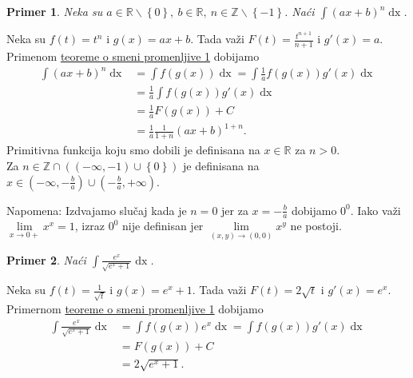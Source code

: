 \documentclass{article}
\newtheorem{prim}{Primer}[section]
\DeclareMathOperator{\dx}{dx}
\begin{document}
\begin{primbox}
    \label{primer_1.7}
    \begin{prim}
        Neka su $a \in \mathbb{R}\backslash\left\{0\right\},\ b\in\mathbb{R},\ n \in \mathbb{Z}\backslash\left\{-1\right\}$. Naći $\displaystyle\int\left(ax + b\right)^n\dx$.
    \end{prim}
    Neka su $f\left(t\right) = t^n$ i $g\left(x\right) = ax+b$. Tada važi $\displaystyle F\left(t\right) = \frac{t^{n+1}}{n+1}$ i $g'\left(x\right) = a$. Primenom \hyperref[teorema_1.2]{teoreme o smeni promenljive 1} dobijamo
    \begin{align*}
        \int\left(ax + b\right)^n\dx & = \int f\left(g\left(x\right)\right)\dx = \int\frac{1}{a}f\left(g\left(x\right)\right)g'\left(x\right)\dx \\
                                     & = \frac{1}{a}\int f\left(g\left(x\right)\right)g'\left(x\right)\dx                                        \\
                                     & = \frac{1}{a}F\left(g\left(x\right)\right) + C                                                            \\
                                     & = \frac{1}{a}\frac{1}{1+n}\left(ax + b\right)^{1+n}.
    \end{align*}
    Primitivna funkcija koju smo dobili je definisana na $x \in \mathbb{R}$ za $n > 0$.\\
    Za $n\in \mathbb{Z} \cap \left(\left(-\infty, -1\right)\cup\left\{0\right\}\right)$ je definisana na $\displaystyle x \in \left(-\infty, -\frac{b}{a}\right)\cup\left(-\frac{b}{a}, +\infty\right)$.\par
    Napomena: Izdvajamo slučaj kada je $n=0$ jer za $\displaystyle x=-\frac{b}{a}$ dobijamo $0^0$. Iako važi $\lim\limits_{x\longrightarrow0+}x^x = 1$, izraz
    $0^0$ nije definisan jer $\lim\limits_{\left(x, y\right)\longrightarrow\left(0,0\right)} x^y$ ne postoji.
\end{primbox}

\begin{primbox}
    \label{primer_1.8}
    \begin{prim}
        Naći $\displaystyle\int \frac{e^x}{\sqrt{e^x + 1}}\dx$.
    \end{prim}
    Neka su $\displaystyle f\left(t\right) = \frac{1}{\sqrt{t}}$ i $g\left(x\right) = e^x+1$. Tada važi $F\left(t\right) = 2  \sqrt{t}$ i $g'\left(x\right) = e^x$. Primernom \hyperref[teorema_1.2]{teoreme o smeni promenljive 1}
    dobijamo
    \begin{align*}
        \int\frac{e^x}{\sqrt{e^x + 1}}\dx & = \int f\left(g\left(x\right)\right)e^x\dx = \int f\left(g\left(x\right)\right)g'\left(x\right)\dx \\
                                          & = F\left(g\left(x\right)\right) + C                                                                \\
                                          & = 2 \sqrt{ e^x+1}.
    \end{align*}
\end{primbox}
\end{document}
